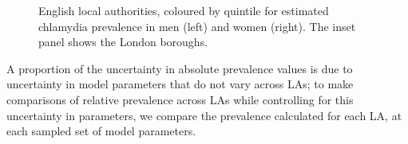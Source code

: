 \documentclass{article}
\begin{document}
    \begin{figure}
        \begin{center}\end{center}
        \caption{English local authorities, coloured by quintile for estimated chlamydia prevalence in men (left) and women (right). The inset panel shows the London boroughs.}
        \label{}
    \end{figure}
    
    A proportion of the uncertainty in absolute prevalence values is due to
uncertainty in model parameters that do not vary across LAs; to make
comparisons of relative prevalence across LAs while controlling for this
uncertainty in parameters, we compare the prevalence calculated for each
LA, at each sampled set of model parameters.
\end{document}

